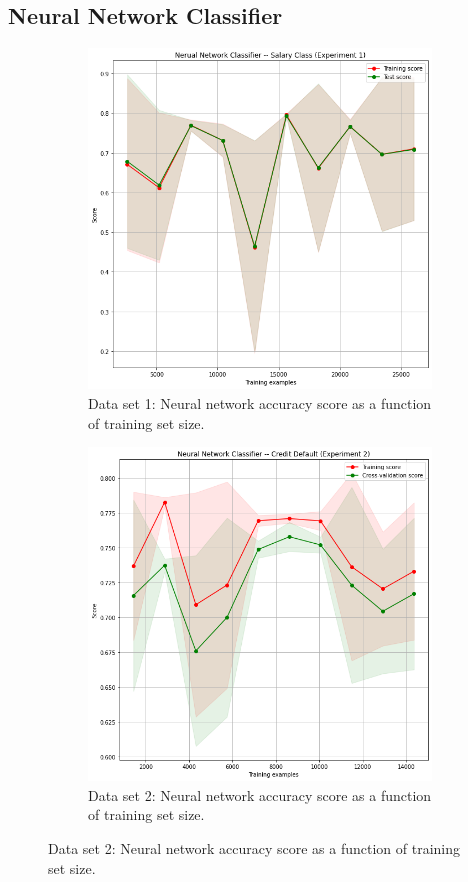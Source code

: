 \documentclass[
	letterpaper, %
]{IEEEtran}
\begin{document}
	\subsection{Neural Network Classifier}
		\begin{figure}[h]
			\begin{subfigure}{.5\textwidth}
				\centering
				\includegraphics[width=.8\linewidth]{./images/nnExp1.png}
				\caption{Data set 1: Neural network accuracy score as a function of training set size.}
				\label{fig:nnExp1}
			\end{subfigure}
			\begin{subfigure}{.5\textwidth}
				\centering
				\includegraphics[width=.8\linewidth]{./images/nnExp2.png}
				\caption{Data set 2: Neural network accuracy score as a function of training set size.}
				\label{fig:nnExp2}
			\end{subfigure}
		\end{figure}
\end{document}
